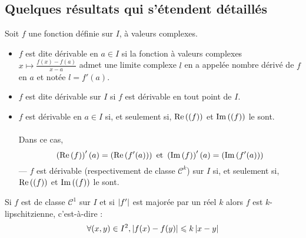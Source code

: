 \subsection{Quelques résultats qui s’étendent détaillés}
Soit \(f\) une fonction définie sur \(I\), à valeurs complexes.
\begin{defi}
    \begin{itemize}
        \item \(f\) est dite dérivable en \(a \in I\) si la fonction à valeurs complexes \(x \mapsto \frac{f (x) - f (a)}{x- a}\) admet une limite complexe \(l\) en a appelée nombre dérivé de \(f\) en \(a\) et notée \(l = f '(a)\).
        \item \(f\) est dite dérivable sur \(I\) si \(f\) est dérivable en tout point de \(I\).
    \end{itemize}
\end{defi}

\begin{defprop}[Caractérisation]
    \begin{itemize}
        \item \(f\) est dérivable en \(a \in I\) si, et seulement si, \(\operatorname{Re}\left( (f )\right)\) et \(\operatorname{Im}\left((f )\right)\) le sont.\\~\\
        Dans ce cas,
            \[\left(\operatorname{Re}\left(f \right)\right)' (a) = \left(\operatorname{Re}\left( f '(a)\right)\right)\text{ et }\left(\operatorname{Im}\left(f \right)\right)' (a) = \left(\operatorname{Im}\left( f '(a)\right)\right) \]
        — \(f\) est dérivable (respectivement de classe \(\mathcal{C}^k\)) sur \(I\) si, et seulement si, \(\operatorname{Re}\left( (f )\right)\) et \(\operatorname{Im}\left((f )\right)\) le sont.
    \end{itemize}
\end{defprop}

\begin{defprop}
    Si \(f\) est de classe \(\mathcal{C}^1\) sur \(I\) et si \(\left\lvert f'\right\rvert\) est majorée par un réel \(k\) alors \(f\) est \(k\)-lipschitzienne, c’est-à-dire :
    \[\forall (x, y) \in I^2, \left\lvert f (x) - f (y)\right\rvert \leqslant k \left\lvert x - y\right\rvert \]
\end{defprop}

